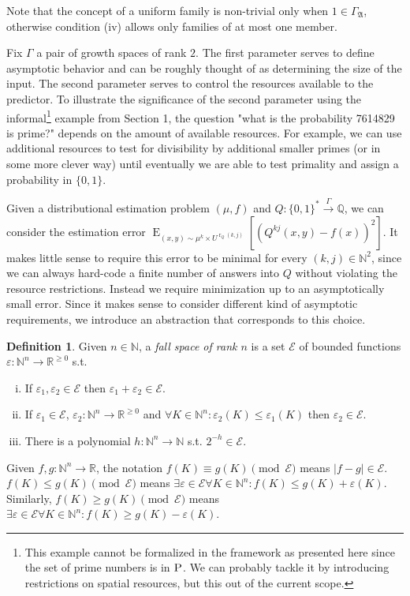 \documentclass{article}
\numberwithin{equation}{section}
\theoremstyle{definition}
\newtheorem{definition}{Definition}[section]
\theoremstyle{plain}
\newcommand{\Words}{{\{ 0, 1 \}^*}}
\DeclareMathOperator{\E}{E}
\DeclareMathOperator{\R}{r}
\newcommand{\Nats}{\mathbb{N}}
\newcommand{\Rats}{\mathbb{Q}}
\newcommand{\Reals}{\mathbb{R}}
\newcommand{\Abs}[1]{\lvert #1 \rvert}
\newcommand{\GrowA}{\Gamma_{\mathfrak{A}}}
\newcommand{\Fall}{\mathcal{E}}
\newcommand{\Scheme}{\xrightarrow{\Gamma}}
\begin{document}
Note that the concept of a uniform family is non-trivial only when $1 \in \GrowA$, otherwise condition (iv) allows only families of at most one member.

Fix $\Gamma$ a pair of growth spaces of rank $2$. The first parameter serves to define asymptotic behavior and can be roughly thought of as determining the size of the input. The second parameter serves to control the resources available to the predictor. To illustrate the significance of the second parameter using the informal\footnote{This example cannot be formalized in the framework as presented here since the set of prime numbers is in $\textsc{P}$. We can probably tackle it by introducing restrictions on spatial resources, but this out of the current scope.} example from Section 1, the question "what is the probability 7614829 is prime?" depends on the amount of available resources. For example, we can use additional resources to test for divisibility by additional smaller primes (or in some more clever way) until eventually we are able to test primality and assign a probability in $\{0,1\}$.

Given a distributional estimation problem $(\mu,f)$ and $Q: \Words \Scheme \Rats$, we can consider the estimation error $\E_{(x,y) \sim \mu^k \times U^{\R_Q(k,j)}}[(Q^{kj}(x,y) - f(x))^2]$. It makes little sense to require this error to be minimal for every $(k,j) \in \Nats^2$, since we can always hard-code a finite number of answers into $Q$ without violating the resource restrictions. Instead we require minimization up to an asymptotically small error. Since it makes sense to consider different kind of asymptotic requirements, we introduce an abstraction that corresponds to this choice.

\begin{definition}

Given $n \in \Nats$, a \emph{fall space of rank $n$} is a set $\Fall$ of bounded functions $\varepsilon: \Nats^n \rightarrow \Reals^{\geq 0}$ s.t.

\begin{enumerate}[(i)]

\item If $\varepsilon_1, \varepsilon_2 \in \Fall$ then $\varepsilon_1 + \varepsilon_2 \in \Fall$.

\item If $\varepsilon_1 \in \Fall$, $\varepsilon_2: \Nats^n \rightarrow \Reals^{\geq 0}$ and $\forall K \in \Nats^n: \varepsilon_2(K) \leq \varepsilon_1(K)$ then $\varepsilon_2 \in \Fall$.

\item There is a polynomial $h: \Nats^n \rightarrow \Nats$ s.t. $2^{-h} \in \Fall$.

\end{enumerate}

Given $f,g: \Nats^n \rightarrow \Reals$, the notation $f(K) \equiv g(K) \pmod \Fall$ means $\Abs{f-g} \in \Fall$. $f(K) \leq g(K) \pmod \Fall$ means $\exists \varepsilon \in \Fall \forall K \in \Nats^n: f(K) \leq g(K) + \varepsilon(K)$. Similarly, $f(K) \geq g(K) \pmod \Fall$ means $\exists \varepsilon \in \Fall \forall K \in \Nats^n: f(K) \geq g(K) - \varepsilon(K)$.

\end{definition}
\end{document}
